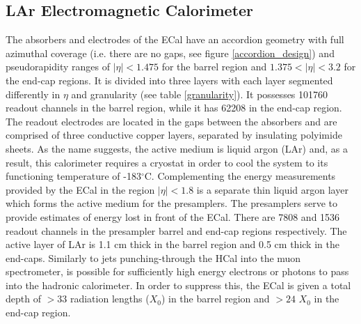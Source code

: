\subsection{LAr Electromagnetic Calorimeter}
The absorbers and electrodes of the ECal have an accordion geometry with full azimuthal coverage (i.e. there are no gaps, see figure \ref{accordion_design}) and pseudorapidity ranges of $| \eta | < 1.475$ for the barrel region and $1.375 < | \eta | < 3.2$ for the end-cap regions. It is divided into three layers with each layer segmented differently in $\eta$ and granularity (see table \ref{granularity}). It possesses 101760 readout channels in the barrel region, while it has 62208 in the end-cap region. The readout electrodes are located in the gaps between the absorbers and are comprised of three conductive copper layers, separated by insulating polyimide sheets. As the name suggests, the active medium is liquid argon (LAr) and, as a result, this calorimeter requires a cryostat in order to cool the system to its functioning temperature of -183$^{\circ}$C. Complementing the energy measurements provided by the ECal in the region $ | \eta | < 1.8$ is a separate thin liquid argon layer which forms the active medium for the presamplers. The presamplers serve to provide estimates of energy lost in front of the ECal. There are 7808 and 1536 readout channels in the presampler barrel and end-cap regions respectively. The active layer of LAr is 1.1 cm thick in the barrel region and 0.5 cm thick in the end-caps. Similarly to jets punching-through the HCal into the muon spectrometer, is possible for sufficiently high energy electrons or photons to pass into the hadronic calorimeter. In order to suppress this, the ECal is given a total depth of $> 33$ radiation lengths ($X_{0}$) in the barrel region and $> 24$ $X_{0}$ in the end-cap region. 

